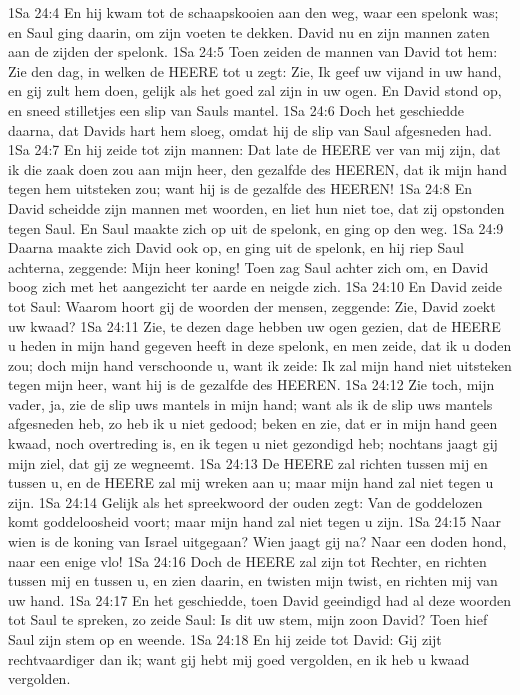 1Sa 24:4  En hij kwam tot de schaapskooien aan den weg, waar een spelonk was; en Saul ging daarin, om zijn voeten te dekken. David nu en zijn mannen zaten aan de zijden der spelonk.
1Sa 24:5  Toen zeiden de mannen van David tot hem: Zie den dag, in welken de HEERE tot u zegt: Zie, Ik geef uw vijand in uw hand, en gij zult hem doen, gelijk als het goed zal zijn in uw ogen. En David stond op, en sneed stilletjes een slip van Sauls mantel.
1Sa 24:6  Doch het geschiedde daarna, dat Davids hart hem sloeg, omdat hij de slip van Saul afgesneden had.
1Sa 24:7  En hij zeide tot zijn mannen: Dat late de HEERE ver van mij zijn, dat ik die zaak doen zou aan mijn heer, den gezalfde des HEEREN, dat ik mijn hand tegen hem uitsteken zou; want hij is de gezalfde des HEEREN!
1Sa 24:8  En David scheidde zijn mannen met woorden, en liet hun niet toe, dat zij opstonden tegen Saul. En Saul maakte zich op uit de spelonk, en ging op den weg.
1Sa 24:9  Daarna maakte zich David ook op, en ging uit de spelonk, en hij riep Saul achterna, zeggende: Mijn heer koning! Toen zag Saul achter zich om, en David boog zich met het aangezicht ter aarde en neigde zich.
1Sa 24:10  En David zeide tot Saul: Waarom hoort gij de woorden der mensen, zeggende: Zie, David zoekt uw kwaad?
1Sa 24:11  Zie, te dezen dage hebben uw ogen gezien, dat de HEERE u heden in mijn hand gegeven heeft in deze spelonk, en men zeide, dat ik u doden zou; doch mijn hand verschoonde u, want ik zeide: Ik zal mijn hand niet uitsteken tegen mijn heer, want hij is de gezalfde des HEEREN.
1Sa 24:12  Zie toch, mijn vader, ja, zie de slip uws mantels in mijn hand; want als ik de slip uws mantels afgesneden heb, zo heb ik u niet gedood; beken en zie, dat er in mijn hand geen kwaad, noch overtreding is, en ik tegen u niet gezondigd heb; nochtans jaagt gij mijn ziel, dat gij ze wegneemt.
1Sa 24:13  De HEERE zal richten tussen mij en tussen u, en de HEERE zal mij wreken aan u; maar mijn hand zal niet tegen u zijn.
1Sa 24:14  Gelijk als het spreekwoord der ouden zegt: Van de goddelozen komt goddeloosheid voort; maar mijn hand zal niet tegen u zijn.
1Sa 24:15  Naar wien is de koning van Israel uitgegaan? Wien jaagt gij na? Naar een doden hond, naar een enige vlo!
1Sa 24:16  Doch de HEERE zal zijn tot Rechter, en richten tussen mij en tussen u, en zien daarin, en twisten mijn twist, en richten mij van uw hand.
1Sa 24:17  En het geschiedde, toen David geeindigd had al deze woorden tot Saul te spreken, zo zeide Saul: Is dit uw stem, mijn zoon David? Toen hief Saul zijn stem op en weende.
1Sa 24:18  En hij zeide tot David: Gij zijt rechtvaardiger dan ik; want gij hebt mij goed vergolden, en ik heb u kwaad vergolden.
